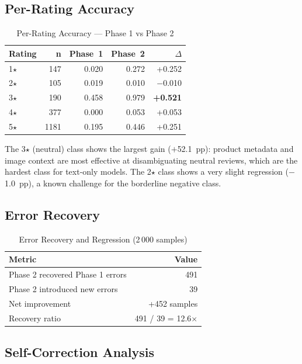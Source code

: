 \documentclass[12pt,a4paper]{article}
\begin{document}
\subsection{Per-Rating Accuracy}

\begin{table}[H]
\centering
\caption{Per-Rating Accuracy --- Phase 1 vs Phase 2}
\begin{tabular}{lrrrr}
\toprule
\textbf{Rating} & \textbf{n} & \textbf{Phase~1} & \textbf{Phase~2} & \textbf{$\Delta$} \\
\midrule
1$\star$ & 147  & 0.020 & 0.272 & +0.252 \\
2$\star$ & 105  & 0.019 & 0.010 & $-$0.010 \\
3$\star$ & 190  & 0.458 & 0.979 & \textbf{+0.521} \\
4$\star$ & 377  & 0.000 & 0.053 & +0.053 \\
5$\star$ & 1181 & 0.195 & 0.446 & +0.251 \\
\bottomrule
\end{tabular}
\end{table}

\noindent The 3$\star$ (neutral) class shows the largest gain ($+$52.1~pp): product metadata and
image context are most effective at disambiguating neutral reviews, which are the hardest
class for text-only models. The 2$\star$ class shows a very slight regression ($-$1.0~pp), a
known challenge for the borderline negative class.

\subsection{Error Recovery}

\begin{table}[H]
\centering
\caption{Error Recovery and Regression (2\,000 samples)}
\begin{tabular}{lr}
\toprule
\textbf{Metric} & \textbf{Value} \\
\midrule
Phase 2 recovered Phase 1 errors & 491 \\
Phase 2 introduced new errors    & 39 \\
Net improvement                  & +452 samples \\
Recovery ratio                   & 491 / 39 = 12.6$\times$ \\
\bottomrule
\end{tabular}
\end{table}

\subsection{Self-Correction Analysis}
\end{document}
